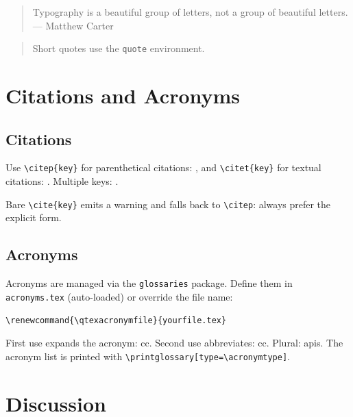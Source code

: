 \documentclass[sans,oneside,numeric,raggedright]{qarticle}
\begin{document}
\begin{quotation}
  Typography is a beautiful group of letters, not a group of beautiful
  letters. --- Matthew Carter
\end{quotation}

\begin{quote}
  Short quotes use the \texttt{quote} environment.
\end{quote}

\section{Citations and Acronyms}\label{sec:citations}

\subsection{Citations}

Use \verb|\citep{key}| for parenthetical citations: \citep{example-book},
and \verb|\citet{key}| for textual citations: \citet{example-paper}.
Multiple keys: \citep{example-book,example-conf}.

Bare \verb|\cite{key}| emits a warning and falls back to \verb|\citep|:
always prefer the explicit form.

\subsection{Acronyms}\label{sec:acronyms}

Acronyms are managed via the \texttt{glossaries} package.  Define them in
\texttt{acronyms.tex} (auto-loaded) or override the file name:

\noindent\verb|\renewcommand{\qtexacronymfile}{yourfile.tex}|

First use expands the acronym: \gls{cc}.  Second use abbreviates: \gls{cc}.
Plural: \glspl{api}.  The acronym list is printed with
\verb|\printglossary[type=\acronymtype]|.

\section{Discussion}\label{sec:discussion}
\end{document}
